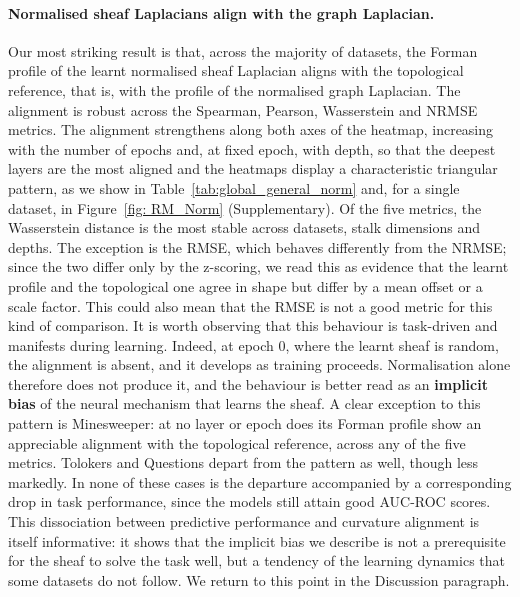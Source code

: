 \paragraph{Normalised sheaf Laplacians align with the graph Laplacian.}
Our most striking result is that, across the majority of datasets, the Forman profile of the learnt normalised sheaf Laplacian aligns with the topological reference, that is, with the profile of the normalised graph Laplacian. The alignment is robust across the Spearman, Pearson, Wasserstein and NRMSE metrics.
The alignment strengthens along both axes of the heatmap,
increasing with the number of epochs and, at fixed epoch, with depth, so that
the deepest layers are the most aligned and the heatmaps display a
characteristic triangular pattern, as we show in Table~\ref{tab:global_general_norm} and, for a single dataset, in Figure~\ref{fig: RM_Norm} (Supplementary).
Of the five metrics, the Wasserstein distance
is the most stable across datasets, stalk dimensions and depths.
The exception
is the RMSE, which behaves differently from the NRMSE; since the two differ only
by the z-scoring, we read this as evidence that the learnt profile and the
topological one agree in shape but differ by a mean offset or a scale factor.
This could also mean that the RMSE is not a good metric for this kind of comparison.
It is worth observing that this behaviour is task-driven and manifests during learning.
Indeed, at epoch $0$, where the learnt sheaf is random, the alignment is absent, and it develops as training proceeds.
Normalisation alone therefore does not produce it, and the behaviour is better read as an \textbf{implicit bias} of the neural mechanism that learns the sheaf.
\newline 
A clear exception to this pattern is Minesweeper: at no layer or epoch does its
Forman profile show an appreciable alignment with the topological reference,
across any of the five metrics. Tolokers and Questions depart from the pattern
as well, though less markedly. In none of these cases is the departure
accompanied by a corresponding drop in task performance, since the models still
attain good AUC-ROC scores. This dissociation between predictive performance
and curvature alignment is itself informative: it shows that the implicit bias
we describe is not a prerequisite for the sheaf to solve the task well, but a
tendency of the learning dynamics that some datasets do not follow. We return
to this point in the Discussion paragraph.



